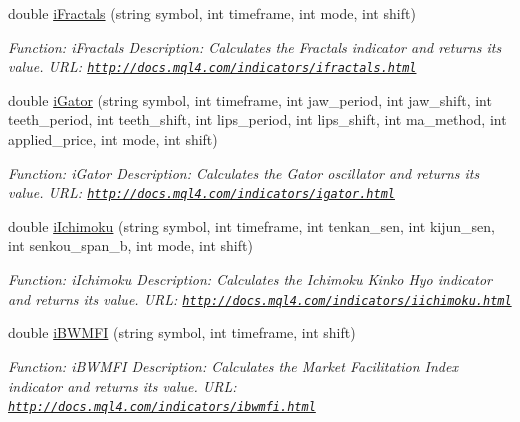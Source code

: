 \begin{DoxyCompactItemize}
double \hyperlink{class_m_q_l4_c_sharp_1_1_base_1_1_m_q_l_base_a8598051ccac71cfdfc99e52e01b7f94f}{i\+Fractals} (string symbol, int timeframe, int mode, int shift)
\begin{DoxyCompactList}\small\item\em Function\+: i\+Fractals Description\+: Calculates the Fractals indicator and returns its value. U\+RL\+: \href{http://docs.mql4.com/indicators/ifractals.html}{\tt http\+://docs.\+mql4.\+com/indicators/ifractals.\+html} \end{DoxyCompactList}\item 
double \hyperlink{class_m_q_l4_c_sharp_1_1_base_1_1_m_q_l_base_a7b6eea8de14fd62e9bc6b684cbde5ef7}{i\+Gator} (string symbol, int timeframe, int jaw\+\_\+period, int jaw\+\_\+shift, int teeth\+\_\+period, int teeth\+\_\+shift, int lips\+\_\+period, int lips\+\_\+shift, int ma\+\_\+method, int applied\+\_\+price, int mode, int shift)
\begin{DoxyCompactList}\small\item\em Function\+: i\+Gator Description\+: Calculates the Gator oscillator and returns its value. U\+RL\+: \href{http://docs.mql4.com/indicators/igator.html}{\tt http\+://docs.\+mql4.\+com/indicators/igator.\+html} \end{DoxyCompactList}\item 
double \hyperlink{class_m_q_l4_c_sharp_1_1_base_1_1_m_q_l_base_ac8ed3b72d9d92d003a41bf53a396fc63}{i\+Ichimoku} (string symbol, int timeframe, int tenkan\+\_\+sen, int kijun\+\_\+sen, int senkou\+\_\+span\+\_\+b, int mode, int shift)
\begin{DoxyCompactList}\small\item\em Function\+: i\+Ichimoku Description\+: Calculates the Ichimoku Kinko Hyo indicator and returns its value. U\+RL\+: \href{http://docs.mql4.com/indicators/iichimoku.html}{\tt http\+://docs.\+mql4.\+com/indicators/iichimoku.\+html} \end{DoxyCompactList}\item 
double \hyperlink{class_m_q_l4_c_sharp_1_1_base_1_1_m_q_l_base_ad69ad895673b3e2a52854835586715a1}{i\+B\+W\+M\+FI} (string symbol, int timeframe, int shift)
\begin{DoxyCompactList}\small\item\em Function\+: i\+B\+W\+M\+FI Description\+: Calculates the Market Facilitation Index indicator and returns its value. U\+RL\+: \href{http://docs.mql4.com/indicators/ibwmfi.html}{\tt http\+://docs.\+mql4.\+com/indicators/ibwmfi.\+html} \end{DoxyCompactList}\item 

\end{DoxyCompactItemize}
